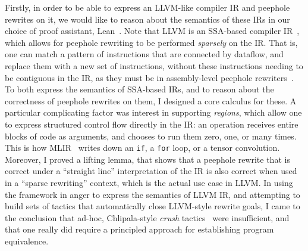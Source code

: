 Firstly, in order to be able to express an LLVM-like compiler IR and peephole rewrites on it,
we would like to reason about the semantics of these IRs in our choice of proof assistant, Lean~\citep{demoura2021lean}.
Note that LLVM is an SSA-based compiler IR~\citep{appel1998ssa,rastello2022ssa},
which allows for peephole rewriting to be performed \emph{sparsely} on the IR.
That is, one can match a pattern of instructions that are connected by dataflow, 
and replace them with a new set of instructions, without these instructions needing to be contiguous in the IR, as they must be in assembly-level peephole rewriters~\citep{mullen2016verified}.
To both express the semantics of SSA-based IRs, and to reason about the correctness of peephole rewrites on them,
I designed a core calculus for these. A particular complicating factor was interest in supporting \emph{regions},
which allow one to express structured control flow directly in the IR:
an operation receives entire blocks of code as arguments, and chooses to run them zero, one, or many times.
This is how MLIR~\citep{lattner2021mlir} writes down an \texttt{if}, a \texttt{for} loop, or a tensor convolution.
Moreover, I proved a lifting lemma, that shows that a peephole rewrite that is correct under a ``straight line'' interpretation of the IR
is also correct when used in a ``sparse rewriting'' context, which is the actual use case in LLVM.
In using the framework in anger to express the semantics of LLVM IR,
and attempting to build sets of tactics that automatically close LLVM-style rewrite goals,
I came to the conclusion that ad-hoc, Chlipala-style \emph{crush} tactics~\citep{chlipala2013certified} were insufficient,
and that one really did require a principled approach for establishing program equivalence.

